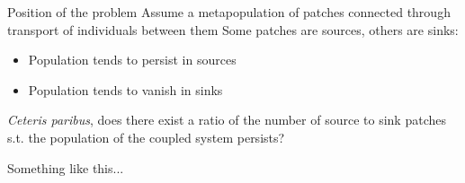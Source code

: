 \documentclass[aspectratio=169]{beamer}
\begin{document}
	
\begin{frame}{Position of the problem}
	Assume a metapopulation of patches connected through transport of individuals between them
	\vfill
	Some patches are sources, others are sinks:
	\begin{itemize}
		\item Population tends to persist in sources
		\item Population tends to vanish in sinks
	\end{itemize}
	\vfill
	\emph{Ceteris paribus}, does there exist a ratio of the number of source to sink patches s.t. the population of the coupled system persists?
\end{frame}

\begin{frame}{Something like this...}
    \begin{center}
\end{center}
\end{frame}
\end{document}
